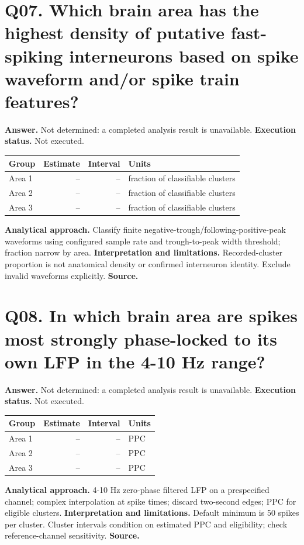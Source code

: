 \documentclass[11pt,a4paper]{article}
\begin{document}
\section*{Q07. Which brain area has the highest density of putative fast-spiking interneurons based on spike waveform and/or spike train features?}
\textbf{Answer.} Not determined: a completed analysis result is unavailable.
\textbf{Execution status.} Not executed.
\begin{tabularx}{\linewidth}{XrrX}\toprule Group & Estimate & Interval & Units \\\midrule
Area 1 & -- & -- & fraction of classifiable clusters \\
Area 2 & -- & -- & fraction of classifiable clusters \\
Area 3 & -- & -- & fraction of classifiable clusters \\
\bottomrule\end{tabularx}
\textbf{Analytical approach.} Classify finite negative-trough/following-positive-peak waveforms using configured sample rate and trough-to-peak width threshold; fraction narrow by area.
\textbf{Interpretation and limitations.} Recorded-cluster proportion is not anatomical density or confirmed interneuron identity. Exclude invalid waveforms explicitly.
\textbf{Source.} 
\clearpage
\section*{Q08. In which brain area are spikes most strongly phase-locked to its own LFP in the 4-10 Hz range?}
\textbf{Answer.} Not determined: a completed analysis result is unavailable.
\textbf{Execution status.} Not executed.
\begin{tabularx}{\linewidth}{XrrX}\toprule Group & Estimate & Interval & Units \\\midrule
Area 1 & -- & -- & PPC \\
Area 2 & -- & -- & PPC \\
Area 3 & -- & -- & PPC \\
\bottomrule\end{tabularx}
\textbf{Analytical approach.} 4-10 Hz zero-phase filtered LFP on a prespecified channel; complex interpolation at spike times; discard two-second edges; PPC for eligible clusters.
\textbf{Interpretation and limitations.} Default minimum is 50 spikes per cluster. Cluster intervals condition on estimated PPC and eligibility; check reference-channel sensitivity.
\textbf{Source.} 
\clearpage
\end{document}
